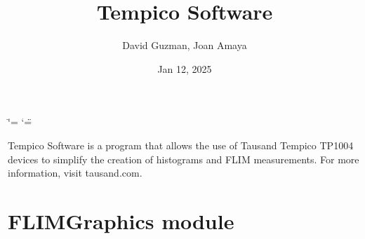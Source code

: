 \documentclass[letterpaper,10pt,english]{sphinxmanual}
\title{Tempico Software}
\date{Jan 12, 2025}
\author{David Guzman, Joan Amaya}
\begin{document}
\ifdefined\shorthandoff
  \ifnum\catcode`\=\string=\active\shorthandoff{=}\fi
  \ifnum\catcode`\"=\active{}\fi
\fi

\pagestyle{empty}
\sphinxmaketitle
\pagestyle{plain}
\sphinxtableofcontents
\pagestyle{normal}
\label{\detokenize{index::doc}}
\begin{figure}[htbp]
\centering

\noindent{}
\end{figure}



\sphinxAtStartPar
Tempico Software is a program that allows the use of Tausand Tempico TP1004 devices to simplify the creation of histograms and FLIM measurements. For more information, visit tausand.com.

\sphinxstepscope


\chapter{FLIMGraphics module}
\label{\detokenize{FLIMGraphics:module-FLIMGraphics}}\label{\detokenize{FLIMGraphics:flimgraphics-module}}\label{\detokenize{FLIMGraphics::doc}}
\end{document}
